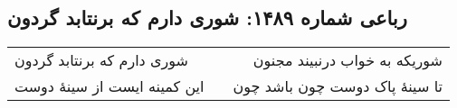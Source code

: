 \begin{center}
\section*{رباعی شماره ۱۴۸۹: شوری دارم که برنتابد گردون}
\label{sec:1489}
\begin{longtable}{l p{0.5cm} r}
شوری دارم که برنتابد گردون
&&
شوریکه به خواب درنبیند مجنون
\\
این کمینه ایست از سینهٔ دوست
&&
تا سینهٔ پاک دوست چون باشد چون
\\
\end{longtable}
\end{center}
